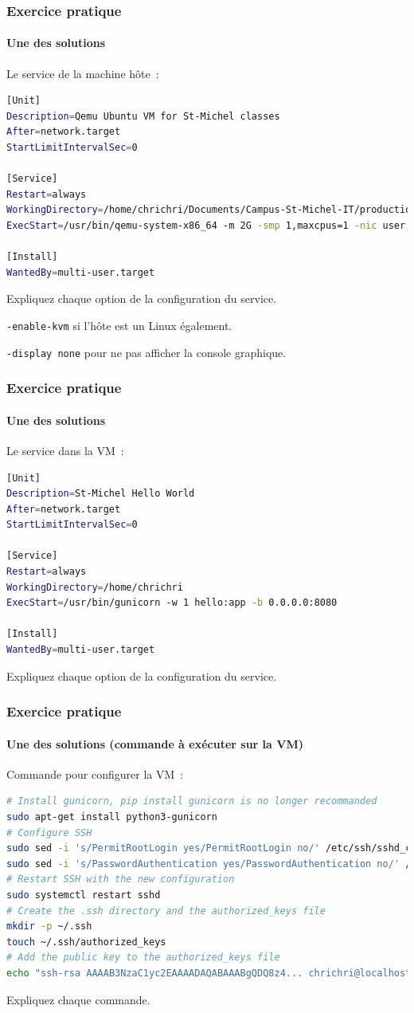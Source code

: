 \documentclass{beamer}
\begin{document}
    \begin{frame}[fragile]
        \transdissolve
        \frametitle{Exercice pratique \execcounterdispinc{}}
        \framesubtitle{Une des solutions}
        Le service de la machine hôte~:
        \begin{lstlisting}[language=bash]
[Unit]
Description=Qemu Ubuntu VM for St-Michel classes
After=network.target
StartLimitIntervalSec=0

[Service]
Restart=always
WorkingDirectory=/home/chrichri/Documents/Campus-St-Michel-IT/production-deployment
ExecStart=/usr/bin/qemu-system-x86_64 -m 2G -smp 1,maxcpus=1 -nic user,hostfwd=tcp::5022-:22,hostfwd=tcp::5080-:8080 -display none -hda linux.qcow2 -k fr -enable-kvm

[Install]
WantedBy=multi-user.target
        \end{lstlisting}
        Expliquez chaque option de la configuration du service.
        \pause
        \begin{dangercolorbox}
            \lstinline{-enable-kvm} si l'hôte est un Linux également.

            \lstinline{-display none} pour ne pas afficher la console graphique.
        \end{dangercolorbox}
    \end{frame}

    \begin{frame}[fragile]
        \transdissolve
        \frametitle{Exercice pratique \execcounterdispinc{}}
        \framesubtitle{Une des solutions}
        Le service dans la VM~:
        \begin{lstlisting}[language=bash]
[Unit]
Description=St-Michel Hello World
After=network.target
StartLimitIntervalSec=0

[Service]
Restart=always
WorkingDirectory=/home/chrichri
ExecStart=/usr/bin/gunicorn -w 1 hello:app -b 0.0.0.0:8080

[Install]
WantedBy=multi-user.target
        \end{lstlisting}
        Expliquez chaque option de la configuration du service.
    \end{frame}

    \begin{frame}[fragile]
        \transdissolve
        \frametitle{Exercice pratique \execcounterdispinc{}}
        \framesubtitle{Une des solutions (commande à exécuter sur la VM)}
        Commande pour configurer la VM~:
        \begin{lstlisting}[language=bash]
# Install gunicorn, pip install gunicorn is no longer recommanded
sudo apt-get install python3-gunicorn
# Configure SSH
sudo sed -i 's/PermitRootLogin yes/PermitRootLogin no/' /etc/ssh/sshd_config
sudo sed -i 's/PasswordAuthentication yes/PasswordAuthentication no/' /etc/ssh/sshd_config
# Restart SSH with the new configuration
sudo systemctl restart sshd
# Create the .ssh directory and the authorized_keys file
mkdir -p ~/.ssh
touch ~/.ssh/authorized_keys
# Add the public key to the authorized_keys file
echo "ssh-rsa AAAAB3NzaC1yc2EAAAADAQABAAABgQDQ8z4... chrichri@localhost" >> ~/.ssh/authorized_keys
        \end{lstlisting}
        Expliquez chaque commande.
    \end{frame}
\end{document}
